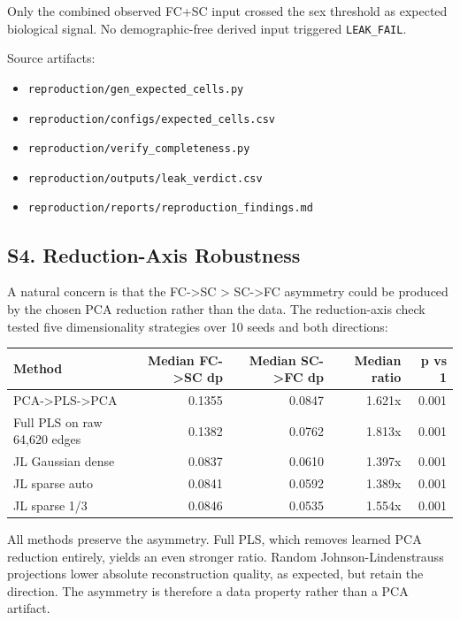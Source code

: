 Only the combined observed FC+SC input crossed the sex threshold as expected biological signal. No demographic-free derived input triggered \texttt{LEAK\_FAIL}.

Source artifacts:

\begin{itemize}
\tightlist
\item
  \texttt{reproduction/gen\_expected\_cells.py}
\item
  \texttt{reproduction/configs/expected\_cells.csv}
\item
  \texttt{reproduction/verify\_completeness.py}
\item
  \texttt{reproduction/outputs/leak\_verdict.csv}
\item
  \texttt{reproduction/reports/reproduction\_findings.md}
\end{itemize}

\subsection{S4. Reduction-Axis Robustness}\label{s4-reduction-axis-robustness}

A natural concern is that the FC-\textgreater SC \textgreater{} SC-\textgreater FC asymmetry could be produced by the chosen PCA reduction rather than the data. The reduction-axis check tested five dimensionality strategies over 10 seeds and both directions:

{\def\LTcaptype{none} %
\begin{longtable}[]{@{}lrrrr@{}}
\toprule\noalign{}
Method & Median FC-\textgreater SC dp & Median SC-\textgreater FC dp & Median ratio & p vs 1 \\
\midrule\noalign{}
\endhead
\bottomrule\noalign{}
\endlastfoot
PCA-\textgreater PLS-\textgreater PCA & 0.1355 & 0.0847 & 1.621x & 0.001 \\
Full PLS on raw 64,620 edges & 0.1382 & 0.0762 & 1.813x & 0.001 \\
JL Gaussian dense & 0.0837 & 0.0610 & 1.397x & 0.001 \\
JL sparse auto & 0.0841 & 0.0592 & 1.389x & 0.001 \\
JL sparse 1/3 & 0.0846 & 0.0535 & 1.554x & 0.001 \\
\end{longtable}
}

All methods preserve the asymmetry. Full PLS, which removes learned PCA reduction entirely, yields an even stronger ratio. Random Johnson-Lindenstrauss projections lower absolute reconstruction quality, as expected, but retain the direction. The asymmetry is therefore a data property rather than a PCA artifact.

